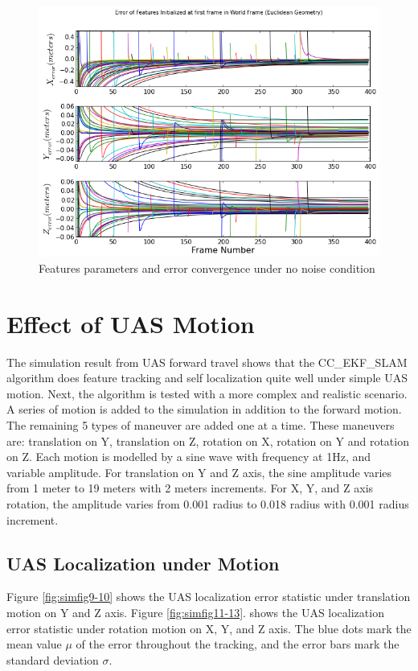 \begin{figure}[h]
\includegraphics[scale=0.3]{./Figures/SimulationFigures/Figure8.png}
\caption{Features parameters and error convergence under no noise condition}
\label{fig:simfig5-8}
\end{figure}

\section{Effect of UAS Motion}

The simulation result from UAS forward travel shows that the 
CC\_EKF\_SLAM algorithm does feature tracking and self localization 
quite well under simple UAS motion. Next, the algorithm is tested with a 
more complex and realistic scenario. A series of motion is added to the 
simulation in addition to the forward motion. The remaining 5 types of 
maneuver are added one at a time. These maneuvers are: translation on Y, 
translation on Z, rotation on X, rotation on Y and rotation on Z. Each 
motion is modelled by a sine wave with frequency at 1Hz, and variable 
amplitude. For translation on Y and Z axis, the sine amplitude varies 
from 1 meter to 19 meters with 2 meters increments. For X, Y, and Z axis 
rotation, the amplitude varies from 0.001 radius to 0.018 radius with 
0.001 radius increment. 

\subsection{UAS Localization under Motion}

Figure \ref{fig:simfig9-10} shows the UAS localization error statistic 
under translation motion on Y and Z axis. Figure \ref{fig:simfig11-13}. 
shows the UAS localization error statistic under rotation motion on X, 
Y, and Z axis. The blue dots mark the mean value $\mu$ of the 
error throughout the tracking, and the error bars mark the standard 
deviation $\sigma$. 


